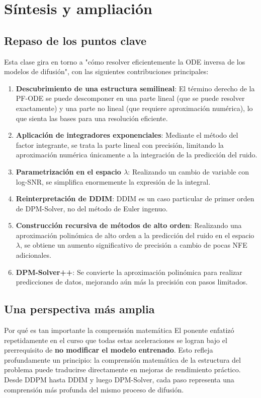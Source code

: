 \section{Síntesis y ampliación}

\subsection{Repaso de los puntos clave}

Esta clase gira en torno a "cómo resolver eficientemente la ODE inversa de los modelos de difusión", con las siguientes contribuciones principales:

\begin{enumerate}
    \item \textbf{Descubrimiento de una estructura semilineal}: El término derecho de la PF-ODE se puede descomponer en una parte lineal (que se puede resolver exactamente) y una parte no lineal (que requiere aproximación numérica), lo que sienta las bases para una resolución eficiente.
    \item \textbf{Aplicación de integradores exponenciales}: Mediante el método del factor integrante, se trata la parte lineal con precisión, limitando la aproximación numérica únicamente a la integración de la predicción del ruido.
    \item \textbf{Parametrización en el espacio $\lambda$}: Realizando un cambio de variable con log-SNR, se simplifica enormemente la expresión de la integral.
    \item \textbf{Reinterpretación de DDIM}: DDIM es un caso particular de primer orden de DPM-Solver, no del método de Euler ingenuo.
    \item \textbf{Construcción recursiva de métodos de alto orden}: Realizando una aproximación polinómica de alto orden a la predicción del ruido en el espacio $\lambda$, se obtiene un aumento significativo de precisión a cambio de pocas NFE adicionales.
    \item \textbf{DPM-Solver++}: Se convierte la aproximación polinómica para realizar predicciones de datos, mejorando aún más la precisión con pasos limitados.
\end{enumerate}

\subsection{Una perspectiva más amplia}

\begin{knowledgebox}{Por qué es tan importante la comprensión matemática}
El ponente enfatizó repetidamente en el curso que todas estas aceleraciones se logran bajo el prerrequisito de \textbf{no modificar el modelo entrenado}. Esto refleja profundamente un principio: la comprensión matemática de la estructura del problema puede traducirse directamente en mejoras de rendimiento práctico. Desde DDPM hasta DDIM y luego DPM-Solver, cada paso representa una comprensión más profunda del mismo proceso de difusión.
\end{knowledgebox}

